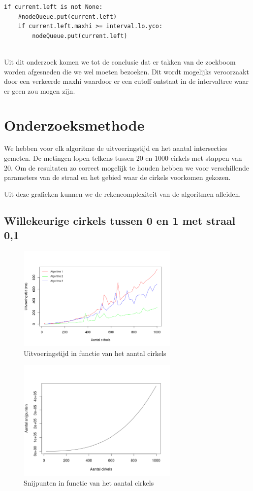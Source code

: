\documentclass[11pt,a4paper]{article}
\begin{document}
\begin{verbatim}
if current.left is not None:
    #nodeQueue.put(current.left)
    if current.left.maxhi >= interval.lo.yco:
        nodeQueue.put(current.left)
                
\end{verbatim}
Uit dit onderzoek komen we tot de conclusie dat er takken van de zoekboom worden afgesneden die we wel moeten bezoeken. Dit wordt mogelijks veroorzaakt door een verkeerde maxhi waardoor er een cutoff ontstaat in de intervaltree waar er geen zou mogen zijn.

\section{Onderzoeksmethode}

We hebben voor elk algoritme de uitvoeringstijd en het aantal intersecties gemeten. De metingen lopen telkens tussen 20 en 1000 cirkels met stappen van 20. Om de resultaten zo correct mogelijk te houden hebben we voor verschillende parameters van de straal en het gebied waar de cirkels voorkomen gekozen.

Uit deze grafieken kunnen we de rekencomplexiteit van de algoritmen afleiden.

\subsection{Willekeurige cirkels tussen 0 en 1 met straal 0,1}
\begin{figure}[H]
\centering
\includegraphics[width=0.7\textwidth]{uitvoeringstijd_01.png}
\caption*{Uitvoeringstijd in functie van het aantal cirkels}
\end{figure}

\begin{figure}[H]
\centering
\includegraphics[width=0.7\textwidth]{snijpunten_01.png}
\caption*{Snijpunten in functie van het aantal cirkels}
\end{figure}
\end{document}
